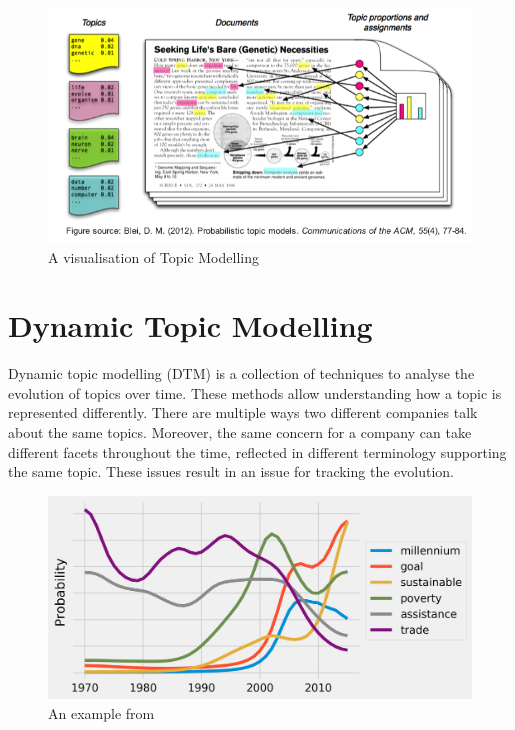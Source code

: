 \documentclass[12pt,MSc,a4paper,oneside]{muthesis}
\begin{document}
\begin{figure}[h]
    \centering
    \includegraphics[scale=0.5]{images/abstract/Topic Modelling Example.png}
    \caption{A visualisation of Topic Modelling}
\end{figure}

\section{Dynamic Topic Modelling}

Dynamic topic modelling (DTM) is a collection of techniques to analyse the evolution of topics over time. These methods allow understanding how a topic is represented differently. There are multiple ways two different companies talk about the same topics. Moreover, the same concern for a company can take different facets throughout the time, reflected in different terminology supporting the same topic. These issues result in an issue for tracking the evolution.

\begin{figure}[h]
    \centering
    \includegraphics[scale=0.17]{images/abstract/DTM example.png}
    \caption{An example from \cite{dtm-example}}
\end{figure}
\end{document}
